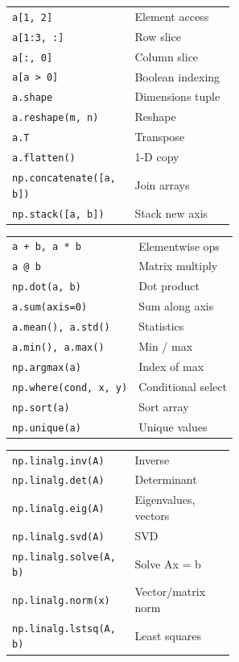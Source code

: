 \documentclass[10pt]{extarticle}
\begin{document}
\begin{multicols}{2}
\begin{tabularx}{\linewidth}{@{}>{\raggedright\arraybackslash}p{0.55\linewidth}@{\enspace}Y@{}}
\texttt{a[1, 2]}                     & Element access \\
\texttt{a[1:3, :]}                   & Row slice \\
\texttt{a[:, 0]}                     & Column slice \\
\texttt{a[a > 0]}                    & Boolean indexing \\
\texttt{a.shape}                     & Dimensions tuple \\
\texttt{a.reshape(m, n)}             & Reshape \\
\texttt{a.T}                         & Transpose \\
\texttt{a.flatten()}                 & 1-D copy \\
\texttt{np.concatenate([a, b])}     & Join arrays \\
\texttt{np.stack([a, b])}           & Stack new axis \\
\end{tabularx}

\begin{tabularx}{\linewidth}{@{}l@{\enspace}Y@{}}
\texttt{a + b, a * b}               & Elementwise ops \\
\texttt{a @ b}                       & Matrix multiply \\
\texttt{np.dot(a, b)}               & Dot product \\
\texttt{a.sum(axis=0)}              & Sum along axis \\
\texttt{a.mean(), a.std()}           & Statistics \\
\texttt{a.min(), a.max()}            & Min / max \\
\texttt{np.argmax(a)}                & Index of max \\
\texttt{np.where(cond, x, y)}       & Conditional select \\
\texttt{np.sort(a)}                  & Sort array \\
\texttt{np.unique(a)}                & Unique values \\
\end{tabularx}

\begin{tabularx}{\linewidth}{@{}>{\raggedright\arraybackslash}p{0.55\linewidth}@{\enspace}Y@{}}
\texttt{np.linalg.inv(A)}           & Inverse \\
\texttt{np.linalg.det(A)}           & Determinant \\
\texttt{np.linalg.eig(A)}           & Eigenvalues, vectors \\
\texttt{np.linalg.svd(A)}           & SVD \\
\texttt{np.linalg.solve(A, b)}      & Solve Ax = b \\
\texttt{np.linalg.norm(x)}          & Vector/matrix norm \\
\texttt{np.linalg.lstsq(A, b)}      & Least squares \\
\end{tabularx}


\end{multicols}
\end{document}
